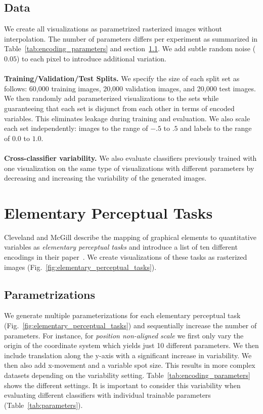 \documentclass[journal]{vgtc}                %
\begin{document}
\subsection{Data}

We create all visualizations as parametrized rasterized images without interpolation. The number of parameters differs per experiment as summarized in Table~\ref{tab:encoding_parameters} and section~\ref{sec:parametrizations}. We add subtle random noise ($0.05$) to each pixel to introduce additional variation.
\\~\\
\noindent\textbf{Training/Validation/Test Splits.} We specify the size of each split set as follows: 60,000 training images, 20,000 validation images, and 20,000 test images. We then randomly add parameterized visualizations to the sets while guaranteeing that each set is disjunct from each other in terms of encoded variables. This eliminates leakage during training and evaluation. We also scale each set independently: images to the range of $-.5$ to $.5$ and labels to the range of $0.0$ to $1.0$. 
\\~\\
\noindent\textbf{Cross-classifier variability.} We also evaluate classifiers previously trained with one visualization on the same type of visualizations with different parameters by decreasing and increasing the variability of the generated images.

\section{Elementary Perceptual Tasks}

Cleveland and McGill describe the mapping of graphical elements to quantitative variables as \emph{elementary perceptual tasks} and introduce a list of ten different encodings in their paper~\cite{cleveland_mcgill}. We create visualizations of these tasks as rasterized images (Fig.~\ref{fig:elementary_perceptual_tasks}).

\subsection{Parametrizations}
\label{sec:parametrizations}
We generate multiple parameterizations for each elementary perceptual task (Fig.~\ref{fig:elementary_perceptual_tasks}) and sequentially increase the number of parameters. For instance, for \emph{position non-aligned scale} we first only vary the origin of the coordinate system which yields just 10 different parameters. We then include translation along the y-axis with a significant increase in variability. We then also add x-movement and a variable spot size. This results in more complex datasets depending on the variability setting. Table~\ref{tab:encoding_parameters} shows the different settings. It is important to consider this variability when evaluating different classifiers with individual trainable parameters (Table~\ref{tab:parameters}).
\end{document}
